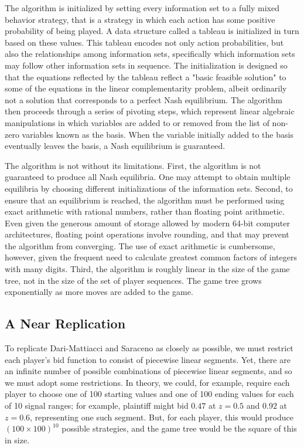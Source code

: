 \documentclass{article}
\begin{document}
The algorithm is initialized by setting every information set to a fully mixed behavior strategy, that is a strategy in which each action has some positive probability of being played. A data structure called a tableau is initialized in turn based on these values. This tableau encodes not only action probabilities, but also the relationships among information sets, specifically which information sets may follow other information sets in sequence. The initialization is designed so that the equations reflected by the tableau reflect a "basic feasible solution" to some of the equations in the linear complementarity problem, albeit ordinarily not a solution that corresponds to a perfect Nash equilibrium.  The algorithm then proceeds through a series of pivoting steps, which represent  linear algebraic manipulations in which variables are added to or removed from the list of non-zero variables known as the basis. When the variable initially added to the basis eventually leaves the basis, a Nash equilibrium is guaranteed.

The algorithm is not without its limitations. First, the algorithm is not guaranteed to produce all Nash equilibria. One may attempt to obtain multiple equilibria by choosing different initializations of the information sets. Second, to ensure that an equilibrium is reached, the algorithm must be performed using exact arithmetic with rational numbers, rather than floating point arithmetic. Even given the generous amount of storage allowed by modern 64-bit computer architectures, floating point operations involve rounding, and that may prevent the algorithm from converging.  The use of exact arithmetic is cumbersome, however, given the frequent need to calculate greatest common factors of integers with many digits. Third, the algorithm is roughly linear in the size of the game tree, not in the size of the set of player sequences. The game tree grows exponentially as more moves are added to the game.

\subsection{A Near Replication} \label{replication}

To replicate Dari-Mattiacci and Saraceno as closely as possible, we must restrict each player's bid function to consist of piecewise linear segments. Yet, there are an infinite number of possible combinations of piecewise linear segments, and so we must adopt some restrictions. In theory, we could, for example, require each player to choose one of 100 starting values and one of 100 ending values for each of 10 signal ranges; for example, plaintiff might bid $0.47$ at $z=0.5$ and $0.92$ at $z=0.6$, representing one such segment. But, for each player, this would produce $(100 \times 100)^{10}$ possible strategies, and the game tree would be the square of this in size. 
\end{document}
